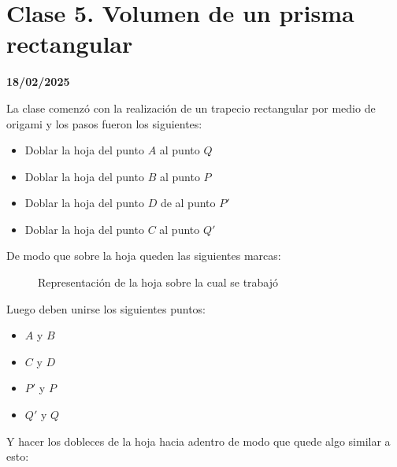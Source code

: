 \chapter{Clase 5. Volumen de un prisma rectangular}\label{chap:C5}
\textbf{18/02/2025}

La clase comenzó con la realización de un trapecio rectangular por medio de origami y los pasos fueron los siguientes:
\begin{itemize}
    \item Doblar la hoja del punto $A$ al punto $Q$
    \item Doblar la hoja del punto $B$ al punto $P$
    \item Doblar la hoja del punto $D$ de al punto $P'$
    \item Doblar la hoja del punto $C$ al punto $Q'$
\end{itemize}

De modo que sobre la hoja queden las siguientes marcas:

\begin{figure}[h!]
    \caption{Representación de la hoja sobre la cual se trabajó}
    \begin{center}
    \end{center}
\end{figure}

Luego deben unirse los siguientes puntos: 

\begin{itemize}
    \item $A$ y $B$
    \item $C$ y $D$
    \item $P'$ y $P$
    \item $Q'$ y $Q$
\end{itemize}
Y hacer los dobleces de la hoja hacia adentro de modo que quede algo similar a esto:

